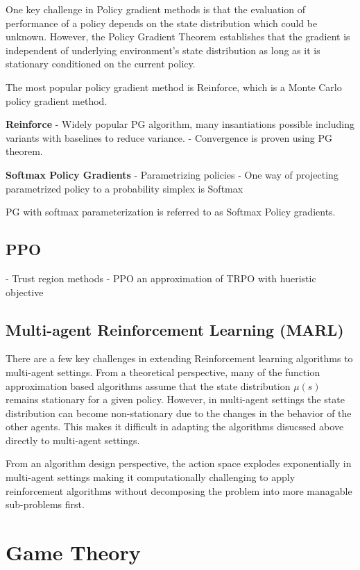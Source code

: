 One key challenge in Policy gradient methods is that the evaluation of performance of a policy
depends on the state distribution which could be unknown.
However, the Policy Gradient Theorem establishes that the gradient is independent of underlying
environment's state distribution as long as it is stationary conditioned on the current policy.

The most popular policy gradient method is Reinforce, which is a Monte Carlo policy gradient
method.

\textbf{Reinforce} -
Widely popular PG algorithm, many insantiations possible including variants with baselines to
reduce variance.
- Convergence is proven using PG theorem.

\textbf{Softmax Policy Gradients}
- Parametrizing policies
- One way of projecting parametrized policy to a probability simplex is Softmax

PG with softmax parameterization is referred to as Softmax Policy gradients.

\subsection{PPO}

- Trust region methods
- PPO an approximation of TRPO with hueristic objective

\subsection{Multi-agent Reinforcement Learning (MARL)}

There are a few key challenges in extending Reinforcement learning algorithms to multi-agent
settings.
From a theoretical perspective, many of the function approximation based algorithms assume that the
state distribution $\mu(s)$ remains stationary for a given policy.
However, in multi-agent settings the state distribution can become non-stationary due to the
changes in the behavior of the other agents.
This makes it difficult in adapting the algorithms disucssed above directly to multi-agent
settings.

From an algorithm design perspective, the action space explodes exponentially in multi-agent
settings making it computationally challenging to apply reinforcement algorithms without
decomposing the problem into more managable sub-problems first.

\section{Game Theory}

